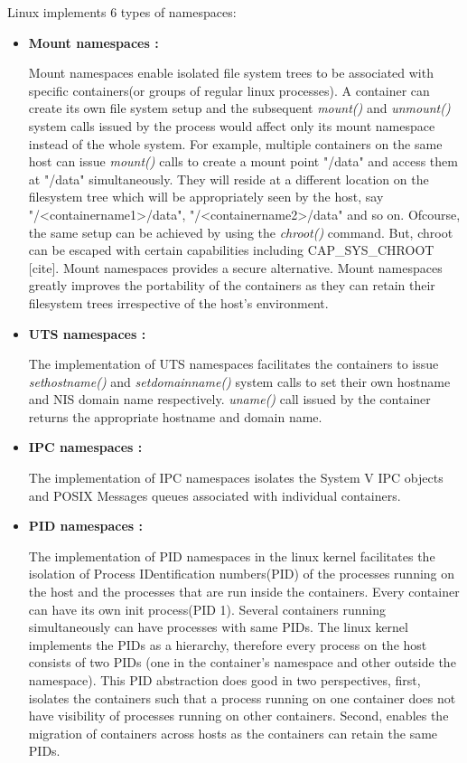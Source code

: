 \newpage
Linux implements 6 types of namespaces: 
\begin{itemize}
\item \textbf{Mount namespaces :}

Mount namespaces enable isolated file system trees to be associated with specific containers(or groups of regular linux processes). A container can create its own file system setup and the subsequent \textit{mount()} and \textit{unmount()} system calls issued by the process would affect only its mount namespace instead of the whole system. For example, multiple containers on the same host can issue \textit{mount()} calls to create a mount point "/data" and access them at "/data" simultaneously. They will reside at a different location on the filesystem tree which will be appropriately seen by the host, say "/\textless containername1\textgreater /data", "/\textless containername2\textgreater /data" and so on. Ofcourse, the same setup can be achieved by using the \textit{chroot()} command. But, chroot can be escaped with certain capabilities including CAP\_SYS\_CHROOT [cite]. Mount namespaces provides a secure alternative. Mount namespaces greatly improves the portability of the containers as they can retain their filesystem trees irrespective of the host's environment.


\item \textbf{UTS namespaces :}

The implementation of UTS namespaces facilitates the containers to issue \textit{sethostname()} and \textit{setdomainname()} system calls to set their own hostname and NIS domain name respectively. \textit{uname()} call issued by the container returns the appropriate hostname and domain name.


\item \textbf{IPC namespaces :}

The implementation of IPC namespaces isolates the System V IPC objects \cite{sysv_ipc} and POSIX Messages queues \cite{posix_msg_queues} associated with individual containers.


\item \textbf{PID namespaces :}

The implementation of PID namespaces in the linux kernel facilitates the isolation of Process IDentification numbers(PID) of the processes running on the host and the processes that are run inside the containers. Every container can have its own init process(PID 1). Several containers running simultaneously can have processes with same PIDs. The linux kernel implements the PIDs as a hierarchy, therefore every process on the host consists of two PIDs (one in the container's namespace and other outside the namespace). This PID abstraction does good in two perspectives, first, isolates the containers such that a process running on one container does not have visibility of processes running on other containers. Second, enables the migration of containers across hosts as the containers can retain the same PIDs.



\end{itemize}
